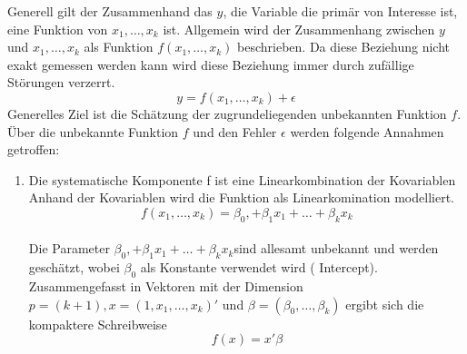 \documentclass[11pt]{report}
\begin{document}
Generell gilt der Zusammenhand das $y$, die Variable die primär von Interesse ist, eine Funktion von $x_1,\dots,x_k$ ist. Allgemein wird der Zusammenhang zwischen $y$ und $x_1,\dots,x_k$ als Funktion $f(x_1,\dots,x_k)$ beschrieben. Da diese Beziehung nicht exakt gemessen werden kann wird diese Beziehung immer durch zufällige Störungen verzerrt.
\begin{equation}
y=f(x_1,\dots,x_k)+\epsilon
\end{equation}\newline
Generelles Ziel ist die Schätzung der zugrundeliegenden unbekannten Funktion $f$. Über die unbekannte Funktion $f$ und den Fehler $\epsilon$ werden folgende Annahmen getroffen:\newline
\begin{enumerate}
\item Die systematische Komponente f ist eine Linearkombination der Kovariablen\\
Anhand der Kovariablen wird die Funktion als Linearkomination modelliert.
\begin{equation}
f(x_1,\dots,x_k) = \beta_0, + \beta_1 x_1 +  \dots + \beta_k x_k
\end{equation}\\
Die Parameter $\beta_0, + \beta_1 x_1 +  \dots + \beta_k x_k $sind allesamt unbekannt und werden geschätzt, wobei $\beta_0$ als Konstante verwendet wird ( Intercept). Zusammengefasst in Vektoren mit der Dimension $p=(k+1) , x=(1,x_1,\dots,x_k)'$ und $\beta=(\beta_0,\dots,\beta_k)$ ergibt sich die kompaktere Schreibweise
\begin{equation}
f(x) = x'\beta
\end{equation}


\end{enumerate}
\end{document}
